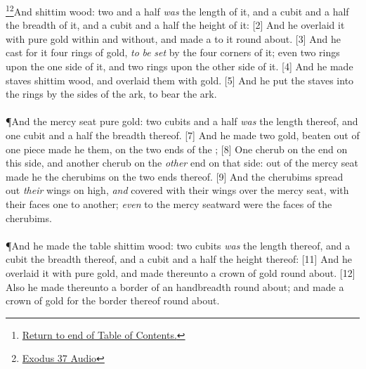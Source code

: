 \footnote{\textcolor[cmyk]{0.99998,1,0,0}{\hyperlink{TOC}{Return to end of Table of Contents.}}}\footnote{\href{https://audiobible.com/bible/exodus_37.html}{\textcolor[cmyk]{0.99998,1,0,0}{Exodus 37 Audio}}}\textcolor[cmyk]{0.99998,1,0,0}{And   shittim wood: two  and a half \emph{was} the length of it, and a cubit and a half the breadth of it, and a cubit and a half the height of it:}
[2] \textcolor[cmyk]{0.99998,1,0,0}{And he overlaid it with pure gold within and without, and made a  to it round about.}
[3] \textcolor[cmyk]{0.99998,1,0,0}{And he cast for it four rings of gold, \emph{to} \emph{be} \emph{set} by the four corners of it; even two rings upon the one side of it, and two rings upon the other side of it.}
[4] \textcolor[cmyk]{0.99998,1,0,0}{And he made staves  shittim wood, and overlaid them with gold.}
[5] \textcolor[cmyk]{0.99998,1,0,0}{And he put the staves into the rings by the sides of the ark, to bear the ark.}\\
\\
\P \textcolor[cmyk]{0.99998,1,0,0}{And  the mercy seat  pure gold: two cubits and a half \emph{was} the length thereof, and one cubit and a half the breadth thereof.}
[7] \textcolor[cmyk]{0.99998,1,0,0}{And he made two   gold, beaten out of one piece made he them, on the two ends of the ;}
[8] \textcolor[cmyk]{0.99998,1,0,0}{One cherub on the end on this side, and another cherub on the \emph{other} end on that side: out of the mercy seat made he the cherubims on the two ends thereof.}
[9] \textcolor[cmyk]{0.99998,1,0,0}{And the cherubims spread out \emph{their} wings on high, \emph{and} covered with their wings over the mercy seat, with their faces one to another; \emph{even} to the mercy seatward were the faces of the cherubims.}\\
\\
\P \textcolor[cmyk]{0.99998,1,0,0}{And he made the table  shittim wood: two cubits \emph{was} the length thereof, and a cubit the breadth thereof, and a cubit and a half the height thereof:}
[11] \textcolor[cmyk]{0.99998,1,0,0}{And he overlaid it with pure gold, and made thereunto a crown of gold round about.}
[12] \textcolor[cmyk]{0.99998,1,0,0}{Also he made thereunto a border of an handbreadth round about; and made a crown of gold for the border thereof round about.}
